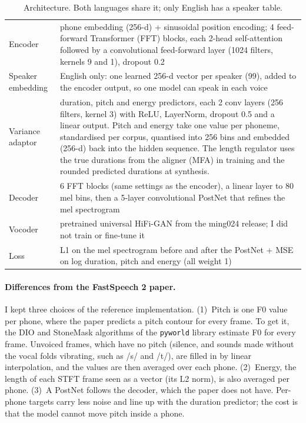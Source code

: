 \documentclass[11pt,a4paper]{article}
\newcommand{\code}[1]{\texttt{#1}}
\begin{document}
\begin{table}[H]\centering\small
\caption{Architecture. Both languages share it; only English has a speaker table.}
\label{tab:arch}
\begin{tabularx}{\linewidth}{@{}lX@{}}
\toprule
Encoder & phone embedding (256-d) + sinusoidal position encoding; 4 feed-forward Transformer (FFT) blocks, each
2-head self-attention followed by a convolutional feed-forward layer (1024 filters, kernels 9 and 1), dropout 0.2 \\
Speaker embedding & English only: one learned 256-d vector per speaker (99), added to the encoder output, so one
model can speak in each voice \\
Variance adaptor & duration, pitch and energy predictors, each 2 conv layers (256 filters, kernel 3) with ReLU,
LayerNorm, dropout 0.5 and a linear output. Pitch and energy take one value per phoneme, standardised per corpus,
quantised into 256 bins and embedded (256-d) back into the hidden sequence. The length regulator uses the true
durations from the aligner (MFA) in training and the rounded predicted durations at synthesis. \\
Decoder & 6 FFT blocks (same settings as the encoder), a linear layer to 80 mel bins, then a 5-layer
convolutional PostNet that refines the mel spectrogram \\
Vocoder & pretrained universal HiFi-GAN from the ming024 release; I did not train or fine-tune it \\
Loss & L1 on the mel spectrogram before and after the PostNet + MSE on log duration, pitch and energy (all weight 1) \\
\bottomrule
\end{tabularx}
\end{table}

\paragraph{Differences from the FastSpeech 2 paper.} I kept three choices of the reference implementation.
(1)~Pitch is one F0 value per phone, where the paper predicts a pitch contour for every frame. To get it, the
DIO and StoneMask algorithms of the \code{pyworld} library estimate F0 for every frame. Unvoiced frames, which
have no pitch (silence, and sounds made without the vocal folds vibrating, such as /s/ and /t/), are filled in by
linear interpolation, and the values are then averaged over each phone. (2)~Energy, the length of each STFT frame
seen as a vector (its L2 norm), is also averaged per phone. (3)~A PostNet follows the decoder, which the paper does
not have. Per-phone targets carry less noise and line up with the duration predictor; the cost is that the model
cannot move pitch inside a phone.
\end{document}
